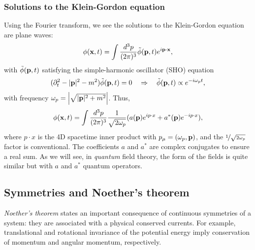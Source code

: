 \subsubsection{Solutions to the Klein-Gordon equation}

Using the Fourier transform, we see the solutions to the Klein-Gordon equation are plane waves:
\begin{equation}
	\label{eq:01_qft_field_kg_solutions}
	\phi(\mathbf{x}, t) = \int \frac{d^3p}{(2\pi)^3} \tilde \phi(\mathbf{p}, t) e^{i\mathbf{p}\cdot\mathbf{x}},
\end{equation}
with $\tilde \phi(\mathbf{p}, t)$ satisfying the simple-harmonic oscillator (SHO) equation
\begin{equation}
	\label{eq:01_qft_field_kg_sho}
	(\partial_t^2 - |\mathbf{p}|^2 - m^2)\tilde \phi(\mathbf{p}, t) = 0 \quad \Rightarrow \quad \tilde \phi(\mathbf{p}, t) \propto e^{-i\omega_p t},
\end{equation}
with frequency $\omega_p = \left\lvert \sqrt{|\mathbf{p}|^2 + m^2} \right\rvert$.
Thus, 
\begin{equation}
	\label{eq:01_qft_field_kg_solutions_final}
	\phi(\mathbf{x}, t) = \int \frac{d^3p}{(2\pi)^3} \frac{1}{\sqrt{2\omega_p}} (a(\mathbf{p})e^{ip\cdot x} + a^*(\mathbf{p})e^{-ip\cdot x}),
\end{equation}
where $p\cdot x$ is the 4D spacetime inner product with $p_\mu = (\omega_p, \mathbf{p})$, and the $\cnicefrac{1}{\sqrt{2\omega_p}}$ factor is conventional.
The coefficients $a$ and $a^*$ are complex conjugates to ensure a real sum.
As we will see, in \textit{quantum} field theory, the form of the fields is quite similar but with $a$ and $a^*$ quantum operators.

\subsection{Symmetries and Noether's theorem}
\label{sec:01_qft_classical_symmetries}

\textit{Noether's theorem} states an important consequence of continuous symmetries of a system: they are associated with a physical conserved currents.
For example, translational and rotational invariance of the potential energy imply conservation of momentum and angular momentum, respectively.

